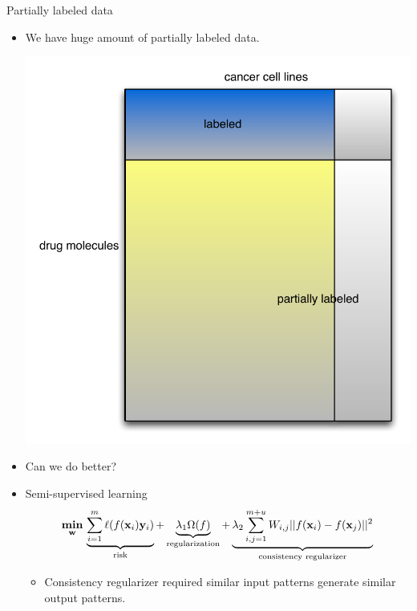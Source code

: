 \documentclass[first=dgreen,second=purple,logo=yellowexc]{aaltoslides}
\begin{document}
{\begin{frame}{Partially labeled data}
	\begin{itemize}
		\item We have huge amount of partially labeled data.
		\begin{center}
			\includegraphics[scale=0.2]{./figures/partiallylabeled.pdf}
		\end{center}
		\item Can we do better?
		\item Semi-supervised learning 
		\begin{align*}
			\underset{\mathbf {w}}{\textbf{min}} \, \underbrace{\sum_{i=1}^m \ell(f(\mathbf {x}_i)\mathbf {y}_i)}_{\text{risk}} + \underbrace{\lambda_1 \Omega(f)}_{\text{regularization}} + \underbrace{\lambda_2\sum_{i,j=1}^{m+u}W_{i,j}||f(\mathbf {x}_i)-f(\mathbf {x}_j)||^2}_{\text{consistency regularizer}}
		\end{align*}
		\begin{itemize}
			\footnotesize
			\item Consistency regularizer required similar input patterns generate similar output patterns.
		\end{itemize}
	\end{itemize}
\end{frame}

}
\end{document}
